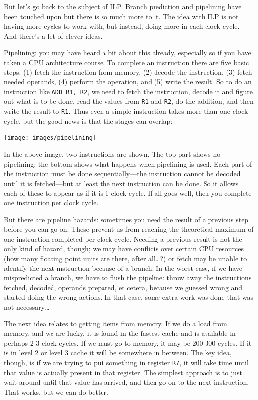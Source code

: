 \documentclass[a4paper]{report}
\begin{document}
But let's go back to the subject of ILP. Branch prediction and pipelining have been touched upon but there is so much more to it. The idea with ILP is not having more cycles to work with, but instead, doing more in each clock cycle. And there's a lot of clever ideas. 

Pipelining: you may have heard a bit about this already, especially so if you have taken a CPU architecture course. To complete an instruction there are five basic steps: (1) fetch the instruction from memory, (2) decode the instruction, (3) fetch needed operands, (4) perform the operation, and (5) write the result. So to do an instruction like \texttt{ADD R1, R2}, we need to fetch the instruction, decode it and figure out what is to be done, read the values from \texttt{R1} and \texttt{R2}, do the addition, and then write the result to \texttt{R1}. Thus even a simple instruction takes more than one clock cycle, but the good news is that the stages can overlap:

\begin{center}
\texttt{[image: images/pipelining]}
\end{center}

In the above image, two instructions are shown. The top part shows no pipelining; the bottom shows what happens when pipelining is used. Each part of the instruction must be done sequentially---the instruction cannot be decoded until it is fetched---but at least the next instruction can be done. So it allows each of these to appear as if it is 1 clock cycle. If all goes well, then you complete one instruction per clock cycle. 

But there are pipeline hazards: sometimes you need the result of a previous step before you can go on. These prevent us from reaching the theoretical maximum of one instruction completed per clock cycle. Needing a previous result is not the only kind of hazard, though; we may have conflicts over certain CPU resources (how many floating point units are there, after all\ldots?) or fetch may be unable to identify the next instruction because of a branch. In the worst case, if we have mispredicted a branch, we have to flush the pipeline: throw away the instructions fetched, decoded, operands prepared, et cetera, because we guessed wrong and started doing the wrong actions. In that case, some extra work was done that was not necessary\ldots

The next idea relates to getting items from memory. If we do a load from memory, and we are lucky, it is found in the fastest cache and is available in perhaps 2-3 clock cycles. If we must go to memory, it may be 200-300 cycles. If it is in level 2 or level 3 cache it will be somewhere in between. The key idea, though, is if we are trying to put something in register \texttt{R7}, it will take time until that value is actually present in that register. The simplest approach is to just wait around until that value has arrived, and then go on to the next instruction. That works, but we can do better.
\end{document}
